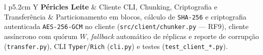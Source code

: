 \documentclass[10pt,a4paper]{article}
\begin{document}
\begin{table}[!htbp]
\begin{tabularx}{\textwidth}{l p{5.2cm} Y}
\textbf{Péricles Leite} & Cliente CLI, Chunking, Criptografia e Transferência & Particionamento em blocos, cálculo de \texttt{SHA-256} e criptografia autenticada \texttt{AES-256-GCM} no cliente (\texttt{src/client/chunker.py} — RF9), cliente assíncrono com quórum $W$, \textit{fallback} automático de réplicas e reporte de corrupção (\texttt{transfer.py}), CLI \texttt{Typer}/\texttt{Rich} (\texttt{cli.py}) e testes (\texttt{test\_client\_*.py}). \\
\bottomrule
\end{tabularx}
\caption{Divisão de responsabilidades e contribuições dos integrantes da equipe na Parte 1.}
\label{tab:equipe}
\end{table}
\end{document}
